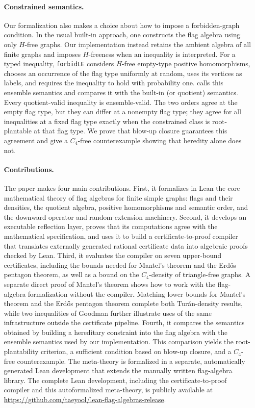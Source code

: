 \documentclass{article}
\newcommand{\lean}[1]{\texttt{#1}}
\begin{document}
\paragraph{Constrained semantics.}
Our formalization also makes a choice about how to impose a forbidden-graph
condition.  In the usual built-in approach, one constructs the flag algebra
using only \(H\)-free graphs.  Our implementation instead retains the ambient
algebra of all finite graphs and imposes \(H\)-freeness when an inequality is
interpreted.  For a typed inequality, \lean{forbidLE} considers \(H\)-free
empty-type positive homomorphisms, chooses an occurrence of the flag type
uniformly at random, uses its vertices as labels, and requires the inequality
to hold with probability one.   calls this ensemble
semantics and compares it with the built-in (or quotient) semantics.  Every
quotient-valid inequality is ensemble-valid.  The two orders agree at the
empty flag type, but they can differ at a nonempty flag type; they agree for all
inequalities at a fixed flag type exactly when the constrained class is
root-plantable at that flag type.  We prove that blow-up closure guarantees this
agreement and give a \(C_4\)-free counterexample showing that heredity alone
does not.

\paragraph{Contributions.}
The paper makes four main contributions.  First, it formalizes in Lean the core
mathematical theory of flag algebras for finite simple graphs: flags and their
densities, the quotient algebra, positive homomorphisms and semantic order,
and the downward operator and random-extension machinery.  Second, it develops
an executable reflection layer, proves that its computations agree with the
mathematical specification, and uses it to build a certificate-to-proof compiler
that translates externally generated rational certificate data into algebraic
proofs checked by Lean.  Third, it evaluates the compiler on seven upper-bound
certificates, including the bounds needed for Mantel's theorem and the
Erd\H{o}s pentagon theorem, as well as a bound on the \(C_4\)-density of
triangle-free graphs.  A separate direct proof of Mantel's theorem shows how
to work with the flag-algebra formalization without the compiler.  Matching
lower bounds for Mantel's theorem and the Erd\H{o}s pentagon theorem complete
both Tur\'an-density results, while two inequalities of Goodman further
illustrate uses of the same infrastructure outside the certificate pipeline.
Fourth, it compares the
semantics obtained by building a hereditary constraint into the flag algebra
with the ensemble semantics used by our implementation.  This comparison
yields the root-plantability criterion, a sufficient condition based on
blow-up closure, and a \(C_4\)-free counterexample.  The meta-theory is
formalized in a separate, automatically generated Lean development that
extends the manually written flag-algebra library.  The complete Lean
development, including the certificate-to-proof compiler and this
autoformalized meta-theory, is publicly available at
\url{https://github.com/taeyool/lean-flag-algebras-release}.
\end{document}
